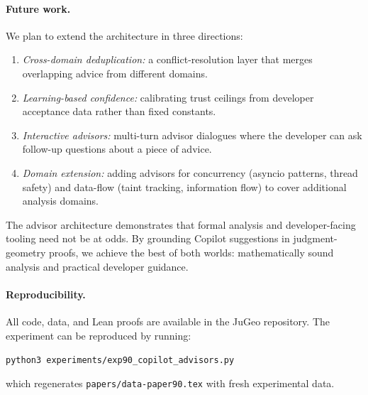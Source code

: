 \documentclass[11pt]{article}
\begin{document}
\paragraph{Future work.}
We plan to extend the architecture in three directions:
\begin{enumerate}
  \item \emph{Cross-domain deduplication:} a conflict-resolution
    layer that merges overlapping advice from different domains.
  \item \emph{Learning-based confidence:} calibrating trust ceilings
    from developer acceptance data rather than fixed constants.
  \item \emph{Interactive advisors:} multi-turn advisor dialogues
    where the developer can ask follow-up questions about a piece
    of advice.
  \item \emph{Domain extension:} adding advisors for concurrency
    (asyncio patterns, thread safety) and data-flow (taint tracking,
    information flow) to cover additional analysis domains.
\end{enumerate}

The advisor architecture demonstrates that formal analysis and
developer-facing tooling need not be at odds.  By grounding Copilot
suggestions in judgment-geometry proofs, we achieve the best of both
worlds: mathematically sound analysis and practical developer guidance.

\paragraph{Reproducibility.}
All code, data, and Lean proofs are available in the JuGeo
repository.  The experiment can be reproduced by running:
\begin{center}
\texttt{python3 experiments/exp90\_copilot\_advisors.py}
\end{center}
which regenerates \texttt{papers/data-paper90.tex} with fresh
experimental data.
\end{document}
